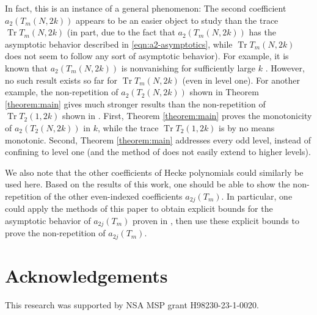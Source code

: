 \documentclass[11pt,letterpaper,reqno]{amsart}
\numberwithin{figure}{section}
\numberwithin{table}{section}
\theoremstyle{definition}
\theoremstyle{plain}
\theoremstyle{definition}
\theoremstyle{definition}
\theoremstyle{remark}
\numberwithin{equation}{section}
\DeclareMathOperator{\Tr}{Tr}
\begin{document}
In fact, this is an instance of a general phenomenon: The second coefficient $a_2(T_m(N,2k))$ appears to be an easier object to study than the trace 
$\Tr T_m(N,2k)$ (in part, due to the fact that $a_2(T_m(N,2k))$ has the asymptotic behavior described in \eqref{eqn:a2-asymptotics}, while $\Tr T_m(N,2k)$ does not seem to follow any sort of asymptotic behavior).
For example, it is known that $a_2(T_m(N,2k))$ is nonvanishing for sufficiently large $k$ \cite[Theorem 1.2]{ross-xue}. However, no such result exists so far for $\Tr T_m(N,2k)$ (even in level one).
For another example, the non-repetition of $a_2(T_2(N,2k))$ shown in Theorem \ref{theorem:main} gives much stronger results than the non-repetition of $\Tr T_2(1,2k)$ shown in \cite[Theorem 1]{chirjorznorepeat}. First, Theorem \ref{theorem:main} proves the monotonicity of $a_2(T_2(N,2k))$ in $k$, while the trace $\Tr T_2(1,2k)$ is by no means monotonic. Second, Theorem \ref{theorem:main} addresses every odd level, instead of confining to level one (and the method of \cite[Theorem 1]{chirjorznorepeat} does not easily extend to higher levels). 


We also note that the other coefficients of Hecke polynomials could similarly be used here. Based on the results of this work, one should be able to show the non-repetition of the other even-indexed coefficients $a_{2j}(T_m)$.
In particular, one could apply the methods of this paper to obtain explicit bounds for the asymptotic behavior of $a_{2j}(T_m)$ proven in \cite[Theorems 1.1, 1.2]{ross-xue-rth-coeff}, then use these explicit bounds to prove the non-repetition of $a_{2j}(T_m)$. 







\section*{Acknowledgements}
This research was supported by NSA MSP grant H98230-23-1-0020.



 

%
%



\providecommand{\bysame}{\leavevmode\hbox
to3em{\hrulefill}\thinspace}



\end{document}
